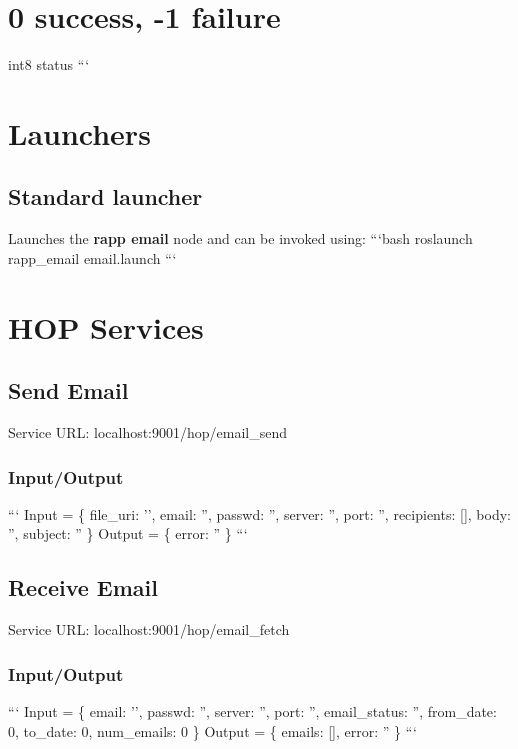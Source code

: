 \section*{0 success, -\/1 failure}

int8 status ```

\section*{Launchers}

\subsection*{Standard launcher}

Launches the {\bfseries rapp email} node and can be invoked using\-: ```bash roslaunch rapp\-\_\-email email.\-launch ```

\section*{H\-O\-P Services}

\subsection*{Send Email}

Service U\-R\-L\-: {\ttfamily localhost\-:9001/hop/email\-\_\-send}

\subsubsection*{Input/\-Output}

``` Input = \{ file\-\_\-uri\-: '', email\-: '', passwd\-: '', server\-: '', port\-: '', recipients\-: \mbox{[}\mbox{]}, body\-: '', subject\-: '' \} {\ttfamily  } Output = \{ error\-: '' \} ```

\subsection*{Receive Email}

Service U\-R\-L\-: {\ttfamily localhost\-:9001/hop/email\-\_\-fetch}

\subsubsection*{Input/\-Output}

``` Input = \{ email\-: '', passwd\-: '', server\-: '', port\-: '', email\-\_\-status\-: '', from\-\_\-date\-: 0, to\-\_\-date\-: 0, num\-\_\-emails\-: 0 \} {\ttfamily  } Output = \{ emails\-: \mbox{[}\mbox{]}, error\-: '' \} ``` 